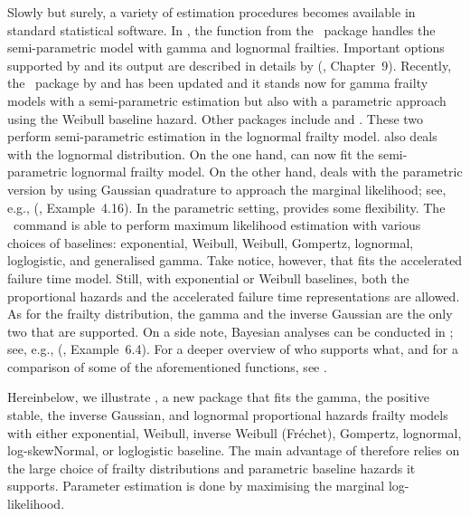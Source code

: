 Slowly but surely, a variety of estimation procedures becomes available in standard statistical software.
In  \citep{R}, the  function from the ~package \citep{R:survival}
  handles the semi-parametric model with gamma and lognormal frailties.
Important options supported by  and its output are described in details by 
  \citeauthor{TherneauGrambsch00} (\citeyear{TherneauGrambsch00}, Chapter~9).
Recently, the ~package \citep{R:frailtypack} by \cite{RondeauGonzales05}
  and \cite{RondeauEtal12} has been updated and it stands now for gamma frailty models
  with a semi-parametric estimation but also with a parametric approach using the Weibull baseline hazard.
Other  packages include  \citep{R:coxme} and  \citep{R:phmm}. 
These two perform semi-parametric estimation in the lognormal frailty model.
 \citep{SAS} also deals with the lognormal distribution. 
On the one hand,  can now fit the semi-parametric lognormal frailty model.
On the other hand,  deals with the parametric version by using Gaussian quadrature to approach the marginal likelihood;
  see, e.g., \citeauthor{DuchateauJanssen08} (\citeyear{DuchateauJanssen08}, Example~4.16).
In the parametric setting,  \citep{STATA} provides some flexibility.
The ~command \citep{Gutierrez02} is able to perform maximum likelihood estimation 
  with various choices of baselines:
  exponential, Weibull, Weibull, Gompertz, lognormal, loglogistic, and generalised gamma.
Take notice, however, that  fits the accelerated failure time model.
Still, with exponential or Weibull baselines, both the proportional hazards and the accelerated failure time
  representations are allowed.   
As for the frailty distribution, the gamma and the inverse Gaussian are the only two that are supported.
On a side note, Bayesian analyses can be conducted in  \citep{Winbugs};
  see, e.g., \citeauthor{DuchateauJanssen08} (\citeyear{DuchateauJanssen08}, Example~6.4).
For a deeper overview of who supports what, and for a comparison of some of the aforementioned functions,
  see \cite{WienkeHirsch11}.


Hereinbelow, we illustrate  \citep{R:parfm}, a new  package that fits 
    the gamma, the positive stable, the inverse Gaussian, and lognormal
    proportional hazards frailty models 
    with either exponential, Weibull, inverse Weibull (Fr\'echet), Gompertz,
    lognormal, log-skewNormal, or loglogistic baseline.
The main advantage of  therefore relies on the large choice 
  of frailty distributions and parametric baseline hazards it supports.
Parameter estimation is done by maximising the marginal log-likelihood.

